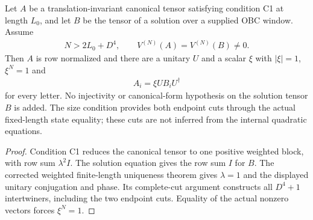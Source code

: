 \begin{lemma}
    \label{lem:quadratic_same_state_unitary_phase}
    \leanok
    Let $A$ be a translation-invariant canonical tensor satisfying
    condition C1 at length $L_0$, and let $B$ be the tensor of a solution
    over a supplied OBC window. Assume
    \begin{align}
        N>2L_0+D^4,\qquad V^{(N)}(A)=V^{(N)}(B)\ne0.
    \end{align}
    Then $A$ is row normalized and there are a unitary $U$ and a scalar
    $\xi$ with $|\xi|=1$, $\xi^N=1$ and
    \begin{align}
        A_i=\xi U B_i U^\dagger
    \end{align}
    for every letter. No injectivity or canonical-form hypothesis on
    the solution tensor $B$ is added. The size condition provides both
    endpoint cuts through the actual fixed-length state equality;
    these cuts are not inferred from the internal quadratic equations.
\end{lemma}
\begin{proof}
    \leanok
    Condition C1 reduces the canonical tensor to one positive weighted
    block, with row sum $\lambda^2I$. The solution equation gives
    the row sum $I$ for $B$. The corrected weighted finite-length
    uniqueness theorem gives $\lambda=1$ and the displayed unitary
    conjugation and phase. Its complete-cut argument constructs all
    $D^4+1$ intertwiners, including the two endpoint cuts. Equality of
    the actual nonzero vectors forces $\xi^N=1$.
\end{proof}

